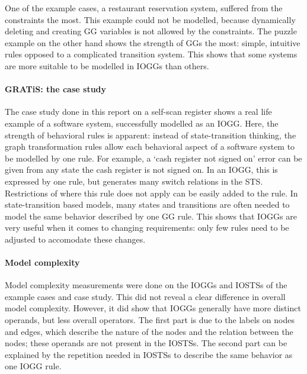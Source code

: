 One of the example cases, a restaurant reservation system, suffered from the constraints the most. This example could not be modelled, because dynamically deleting and creating GG variables is not allowed by the constraints. The puzzle example on the other hand shows the strength of GGs the most: simple, intuitive rules opposed to a complicated transition system. This shows that some systems are more suitable to be modelled in IOGGs than others.

\paragraph*{GRATiS: the case study}
The case study done in this report on a self-scan register shows a real life example of a software system, successfully modelled as an IOGG. Here, the strength of behavioral rules is apparent: instead of state-transition thinking, the graph transformation rules allow each behavioral aspect of a software system to be modelled by one rule. For example, a `cash register not signed on' error can be given from any state the cash register is not signed on. In an IOGG, this is expressed by one rule, but generates many switch relations in the STS. Restrictions of where this rule does not apply can be easily added to the rule. In state-transition based models, many states and transitions are often needed to model the same behavior described by one GG rule. This shows that IOGGs are very useful when it comes to changing requirements: only few rules need to be adjusted to accomodate these changes.

\paragraph*{Model complexity}
Model complexity measurements were done on the IOGGs and IOSTSs of the example cases and case study. This did not reveal a clear difference in overall model complexity. However, it did show that IOGGs generally have more distinct operands, but less overall operators. The first part is due to the labels on nodes and edges, which describe the nature of the nodes and the relation between the nodes; these operands are not present in the IOSTSs. The second part can be explained by the repetition needed in IOSTSs to describe the same behavior as one IOGG rule.
